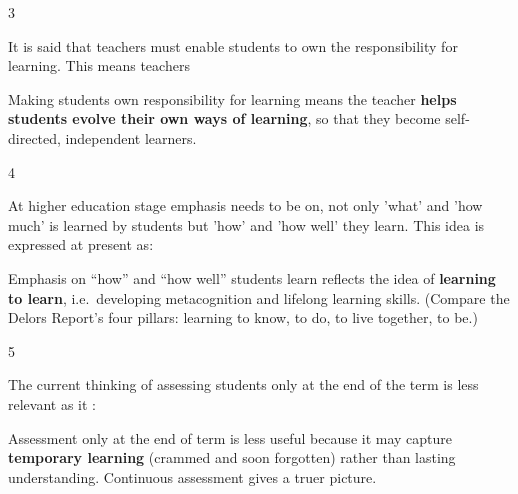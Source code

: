 \begin{question}{3}
{It is said that teachers must enable students to own the responsibility for learning. This means teachers\par}
\begin{explain}
Making students own responsibility for learning means the teacher \textbf{helps students evolve their own ways of learning}, so that they become self-directed, independent learners.
\end{explain}
\end{question}

\begin{question}{4}
{At higher education stage emphasis needs to be on, not only 'what' and 'how much' is learned by students but 'how' and 'how well' they learn. This idea is expressed at present as:\par}
\begin{explain}
Emphasis on ``how'' and ``how well'' students learn reflects the idea of \textbf{learning to learn}, i.e.\ developing metacognition and lifelong learning skills. (Compare the Delors Report's four pillars: learning to know, to do, to live together, to be.)
\end{explain}
\end{question}

\begin{question}{5}
{The current thinking of assessing students only at the end of the term is less relevant as it :\par}
\begin{explain}
Assessment only at the end of term is less useful because it may capture \textbf{temporary learning} (crammed and soon forgotten) rather than lasting understanding. Continuous assessment gives a truer picture.
\end{explain}
\end{question}


